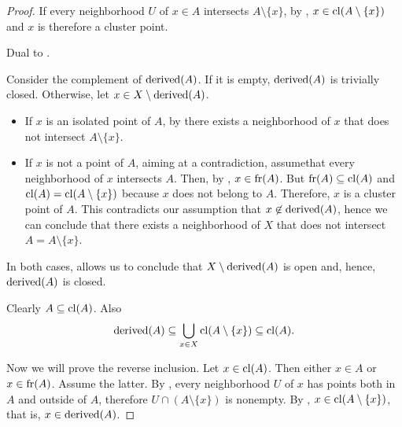 \begin{proof}
   If every neighborhood \( U \) of \( x \in A \) intersects \( A \setminus \{ x \} \), by , \( x \in \operatorname{cl}(A \setminus \{ x \}) \) and \( x \) is therefore a cluster point.

   Dual to .

   Consider the complement of \( \operatorname{derived}(A) \). If it is empty, \( \operatorname{derived}(A) \) is trivially closed. Otherwise, let \( x \in X \setminus \operatorname{derived}(A) \).

  \begin{itemize}
    \item If \( x \) is an isolated point of \( A \), by  there exists a neighborhood of \( x \) that does not intersect \( A \setminus \{ x \} \).
    \item If \( x \) is not a point of \( A \), aiming at a contradiction, assume\LEM that every neighborhood of \( x \) intersects \( A \). Then, by , \( x \in \operatorname{fr}(A) \). But \( \operatorname{fr}(A) \subseteq \operatorname{cl}(A) \) and \( \operatorname{cl}(A) = \operatorname{cl}(A \setminus \{ x \}) \) because \( x \) does not belong to \( A \). Therefore, \( x \) is a cluster point of \( A \). This contradicts our assumption that \( x \not\in \operatorname{derived}(A) \), hence we can conclude that there exists a neighborhood of \( X \) that does not intersect \( A = A \setminus \{ x \} \).
  \end{itemize}

  In both cases,  allows us to conclude that \( X \setminus \operatorname{derived}(A) \) is open and, hence, \( \operatorname{derived}(A) \) is closed.

   Clearly \( A \subseteq \operatorname{cl}(A) \). Also
  \begin{equation*}
    \operatorname{derived}(A) \subseteq \bigcup_{x \in X} \operatorname{cl}(A \setminus \{ x \}) \subseteq \operatorname{cl}(A).
  \end{equation*}

  Now we will prove the reverse inclusion. Let \( x \in \operatorname{cl}(A) \). Then either \( x \in A \) or \( x \in \operatorname{fr}(A) \). Assume the latter. By , every neighborhood \( U \) of \( x \) has points both in \( A \) and outside of \( A \), therefore \( U \cap (A \setminus \{ x \}) \) is nonempty. By , \( x \in \operatorname{cl}(A \setminus \{ x \}) \), that is, \( x \in \operatorname{derived}(A) \).


\end{proof}
